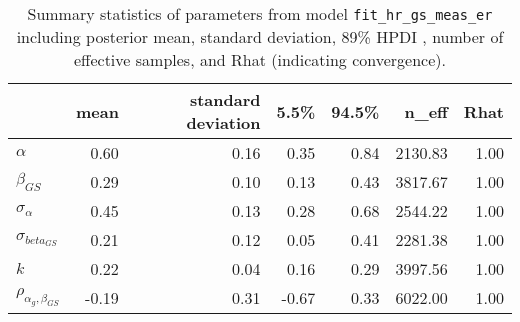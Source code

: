 \begin{table}[ht]
\centering
\begin{tabular}{lrrrrrr}
  \hline
 & mean & standard deviation & 5.5\% & 94.5\% & n\_eff & Rhat \\ 
  \hline
$\alpha$ & 0.60 & 0.16 & 0.35 & 0.84 & 2130.83 & 1.00 \\ 
  $\beta_{GS}$ & 0.29 & 0.10 & 0.13 & 0.43 & 3817.67 & 1.00 \\ 
  $\sigma_{\alpha}$ & 0.45 & 0.13 & 0.28 & 0.68 & 2544.22 & 1.00 \\ 
  $\sigma_{beta_{GS}}$ & 0.21 & 0.12 & 0.05 & 0.41 & 2281.38 & 1.00 \\ 
  $k$ & 0.22 & 0.04 & 0.16 & 0.29 & 3997.56 & 1.00 \\ 
  $\rho_{\alpha_g,\beta_{GS}}$ & -0.19 & 0.31 & -0.67 & 0.33 & 6022.00 & 1.00 \\ 
   \hline
\end{tabular}
\caption{Summary statistics of parameters from model  \texttt{fit\_hr\_gs\_meas\_er} including posterior mean, standard deviation, 89\% HPDI , number of effective samples, and Rhat (indicating convergence).} 
\label{tab:precis_hr_gs_me}
\end{table}
